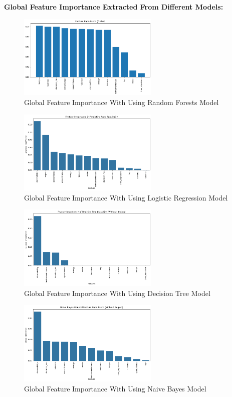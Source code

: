 \textbf{Global Feature Importance Extracted From Different Models:}

\begin{figure}[h] 
    \centering 
    \includegraphics[width=0.6\textwidth]{media/random_forest_feature_imp_global.png}
    \caption{Global Feature Importance With Using Random Forests Model}

\end{figure}
\begin{figure}[h] 
    \centering 
    \includegraphics[width=0.6\textwidth]{media/logistic_reg_feature_imp_global.png}
    \caption{Global Feature Importance With Using Logistic Regression Model}

\end{figure}
\begin{figure}[h] 
    \centering 
    \includegraphics[width=0.6\textwidth]{media/decision_tree_fea_imp_global.png}
    \caption{Global Feature Importance With Using Decision Tree Model}

\end{figure}
\begin{figure}[h] 
    \centering 
    \includegraphics[width=0.6\textwidth]{media/naive_bayes_fea_imp_global.png}
    \caption{Global Feature Importance With Using Naive Bayes Model}

\end{figure}
